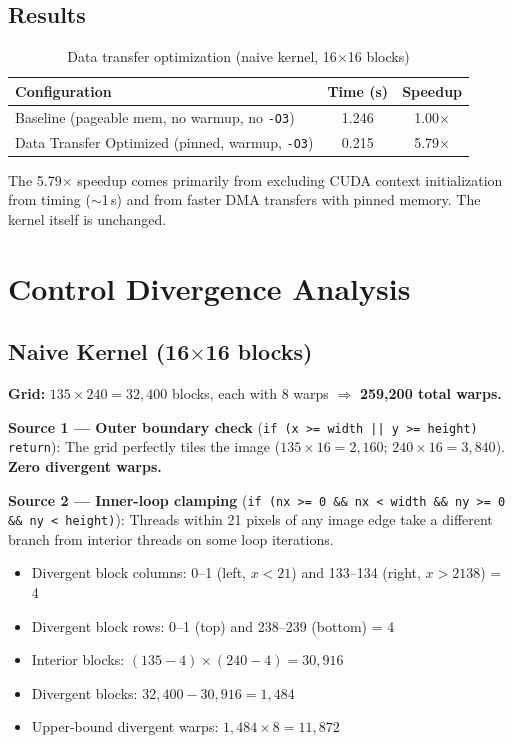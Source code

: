 \documentclass[11pt]{article}
\begin{document}
\subsection{Results}

\begin{table}[h]
\centering
\caption{Data transfer optimization (naive kernel, 16$\times$16 blocks)}
\smallskip
\begin{tabular}{l c c}
\toprule
\textbf{Configuration} & \textbf{Time (s)} & \textbf{Speedup} \\
\midrule
Baseline (pageable mem, no warmup, no \texttt{-O3}) & 1.246 & 1.00$\times$ \\
\rowcolor{green!15}
Data Transfer Optimized (pinned, warmup, \texttt{-O3}) & 0.215 & 5.79$\times$ \\
\bottomrule
\end{tabular}
\end{table}

The 5.79$\times$ speedup comes primarily from excluding CUDA context initialization
from timing (${\sim}$1\,s) and from faster DMA transfers with pinned memory. The
kernel itself is unchanged.

\section{Control Divergence Analysis}

\subsection{Naive Kernel (16$\times$16 blocks)}

\noindent\textbf{Grid:} $135 \times 240 = 32{,}400$ blocks, each with 8 warps
$\Rightarrow$ \textbf{259,200 total warps.}

\medskip\noindent\textbf{Source 1 --- Outer boundary check}
(\texttt{if (x >= width || y >= height) return}):
The grid perfectly tiles the image ($135 \times 16 = 2{,}160$;
$240 \times 16 = 3{,}840$). \textbf{Zero divergent warps.}

\medskip\noindent\textbf{Source 2 --- Inner-loop clamping}
(\texttt{if (nx >= 0 \&\& nx < width \&\& ny >= 0 \&\& ny < height)}):
Threads within 21 pixels of any image edge take a different branch from interior
threads on some loop iterations.

\begin{itemize}[]
  \item Divergent block columns: 0--1 (left, $x < 21$) and 133--134 (right, $x > 2138$) = 4
  \item Divergent block rows: 0--1 (top) and 238--239 (bottom) = 4
  \item Interior blocks: $(135 - 4) \times (240 - 4) = 30{,}916$
  \item Divergent blocks: $32{,}400 - 30{,}916 = 1{,}484$
  \item Upper-bound divergent warps: $1{,}484 \times 8 = 11{,}872$
\end{itemize}
\end{document}
